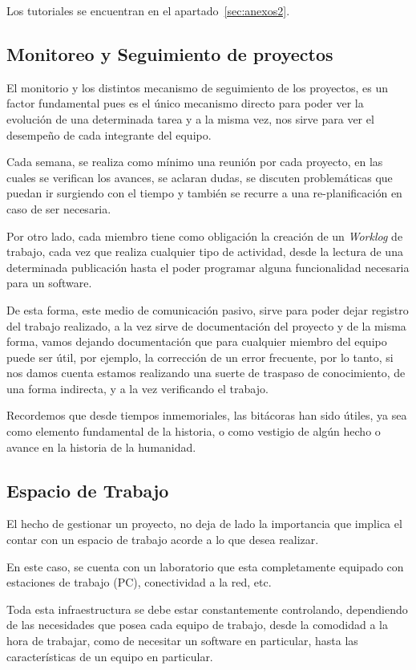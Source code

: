 Los tutoriales se encuentran en el apartado~\ref{sec:anexos2}.

\subsection{Monitoreo y Seguimiento de proyectos}

El monitorio y los distintos mecanismo de seguimiento de los proyectos,
es un factor fundamental pues es el único mecanismo directo para poder
ver la evolución de una determinada tarea y a la misma vez, nos sirve
para ver el desempeño de cada integrante del equipo.

Cada semana, se realiza como mínimo una reunión por cada proyecto,
en las cuales se verifican los avances, se aclaran dudas, se discuten
problemáticas que puedan ir surgiendo con el tiempo y también
se recurre a una re-planificación en caso de ser necesaria.

Por otro lado, cada miembro tiene como obligación la creación
de un \emph{Worklog} de trabajo, cada vez que realiza cualquier
tipo de actividad, desde la lectura de una determinada publicación
hasta el poder programar alguna funcionalidad necesaria para un software.

De esta forma, este medio de comunicación pasivo, sirve para poder
dejar registro del trabajo realizado, a la vez sirve de documentación
del proyecto y de la misma forma, vamos dejando documentación que 
para cualquier miembro del equipo puede ser útil, por ejemplo, la corrección
de un error frecuente, por lo tanto, si nos damos cuenta estamos
realizando una suerte de traspaso de conocimiento, de una forma
indirecta, y a la vez verificando el trabajo.

Recordemos que desde tiempos inmemoriales, las bitácoras han sido útiles,
ya sea como elemento fundamental de la historia, o como vestigio
de algún hecho o avance en la historia de la humanidad.

\subsection{Espacio de Trabajo}

El hecho de gestionar un proyecto, no deja de lado la importancia
que implica el contar con un espacio de trabajo acorde a lo que desea realizar.

En este caso, se cuenta con un laboratorio que esta completamente equipado con
estaciones de trabajo (PC), conectividad a la red, etc.

Toda esta infraestructura se debe estar constantemente controlando,
dependiendo de las necesidades que posea
cada equipo de trabajo, desde la comodidad a la hora de trabajar, como de necesitar
un software en particular, hasta las características de un equipo en particular.

